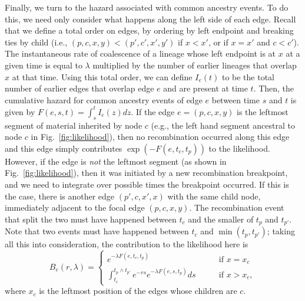 \documentclass{article}
\begin{document}
Finally, we turn to the hazard associated with common ancestry events.
To do this,
we need only consider what happens along the left side of each edge.
Recall that we define a total order on edges,
by ordering by left endpoint and breaking ties by child
(i.e., $(p,c,x,y) < (p',c',x',y')$
if $x<x'$, or if $x=x'$ and $c<c'$).
The instantaneous rate of coalescence of a lineage whose left endpoint is at $x$
at a given time is equal to $\lambda$ multiplied
by the number of earlier lineages that overlap $x$ at that time.
Using this total order, we can define
$I_e(t)$ to be the total number of earlier edges that overlap edge $e$
and are present at time $t$.
Then, the cumulative hazard for common ancestry events of edge $e$
between time $s$ and $t$ is given by $F(e, s, t) = \int_{s}^{t} I_{e}(z) dz$.
If the edge $e = (p,c,x,y)$
is the leftmost segment of material inherited by node $c$
(e.g., the left hand segment ancestral to node $c$
in Fig.~\ref{fig:likelihood}),
then no recombination occurred along this edge and 
this edge simply contributes $\exp(-F(e,t_c,t_p))$ to the likelihood.
However, if the edge is \emph{not} the leftmost segment
(as shown in Fig.~\ref{fig:likelihood}),
then it was initiated by a new recombination breakpoint,
and we need to integrate over possible times the breakpoint occurred.
If this is the case, there is another edge $(p',c,x',x)$ with the same child node,
immediately adjacent to the focal edge $(p,c,x,y)$.
The recombination event that split the two must have happened between $t_c$
and the smaller of $t_p$ and $t_{p'}$. Note that two events must have happened
between $t_c$ and $\min(t_p, t_{p'})$; taking all this into consideration,
the contribution to the likelihood here is
\begin{equation}\label{eq:depth}
B_e(r, \lambda) = \begin{cases}
    e^{-\lambda F(e, t_c, t_p)}
        & \qquad \text{if } x=x_{c} \\
    \int_{t_c}^{t_{p} \wedge t_{p'}} e^{- r s} e^{-\lambda F(e, s, t_{p})} ds
        & \qquad \text{if } x>x_{c} ,
\end{cases}
\end{equation}
where $x_c$ is the leftmost position of the edges whose children are $c$.
\end{document}

